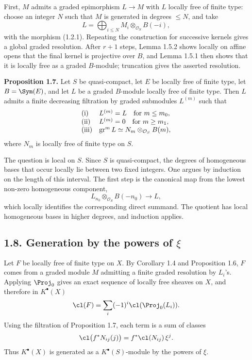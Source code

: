 First, \(M\) admits a graded epimorphism \(L\to M\) with \(L\) locally free of finite type: choose an integer \(N\) such that \(M\) is generated in degrees \(\leq N\), and take
\[
  L=\bigoplus_{i\leq N} M_i\otimes_{\mathcal O_S} B(-i),
\]
with the morphism (1.2.1). Repeating the construction for successive kernels gives a global graded resolution. After \(r+1\) steps, Lemma 1.5.2 shows locally on affine opens that the final kernel is projective over \(B\), and Lemma 1.5.1 then shows that it is locally free as a graded \(B\)-module; truncation gives the asserted resolution.

\textbf{Proposition 1.7.} Let \(S\) be quasi-compact, let \(E\) be locally free of finite type, let \(B=\Sym(E)\), and let \(L\) be a graded \(B\)-module locally free of finite type. Then \(L\) admits a finite decreasing filtration by graded submodules \(L^{(m)}\) such that
\[
\begin{array}{ll}
\text{\rm (i)}& L^{(m)}=L\quad\text{for }m\leq m_0,\\
\text{\rm (ii)}& L^{(m)}=0\quad\text{for }m\geq m_1,\\
\text{\rm (iii)}& \operatorname{gr}^m L
  \simeq N_m\otimes_{\mathcal O_S}B(m),
\end{array}
\]
where \(N_m\) is locally free of finite type on \(S\).

The question is local on \(S\). Since \(S\) is quasi-compact, the degrees of homogeneous bases that occur locally lie between two fixed integers. One argues by induction on the length of this interval. The first step is the canonical map from the lowest non-zero homogeneous component,
\[
  L_{n_0}\otimes_{\mathcal O_S}B(-n_0)\longrightarrow L,
\]
which locally identifies the corresponding direct summand. The quotient has local homogeneous bases in higher degrees, and induction applies.

\subsection*{1.8. Generation by the powers of \(\xi\)}
Let \(F\) be locally free of finite type on \(X\). By Corollary 1.4 and Proposition 1.6, \(F\) comes from a graded module \(M\) admitting a finite graded resolution by \(L_i\)'s. Applying \(\Proj_0\) gives an exact sequence of locally free sheaves on \(X\), and therefore in \(K^\bullet(X)\)
\[
  \cl(F)=\sum_i(-1)^i\cl(\Proj_0(L_i)).
\]
Using the filtration of Proposition 1.7, each term is a sum of classes
\[
  \cl\bigl(f^*N_{ij}(j)\bigr)=f^*\cl(N_{ij})\,\xi^j .
\]
Thus \(K^\bullet(X)\) is generated as a \(K^\bullet(S)\)-module by the powers of \(\xi\).

